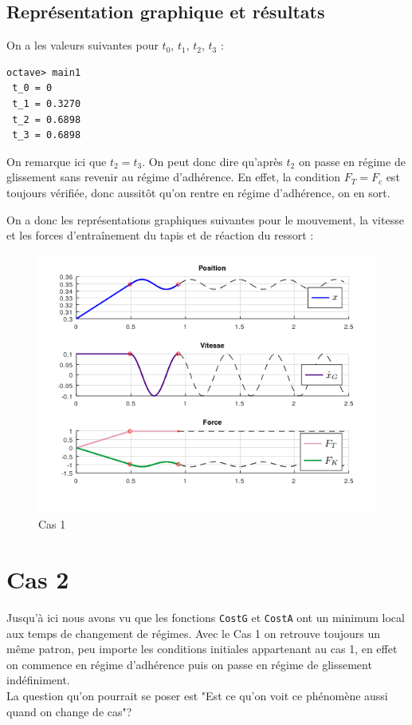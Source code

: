 \documentclass{article}
\newcommand{\ts}{\scriptscriptstyle}
\begin{document}
\subsection{Représentation graphique et résultats}
On a les valeurs suivantes pour $t_0$, $t_1$, $t_2$, $t_3$ :
\begin{lstlisting}
octave> main1
 t_0 = 0
 t_1 = 0.3270
 t_2 = 0.6898
 t_3 = 0.6898
\end{lstlisting}

On remarque ici que $t_2 = t_3$. On peut donc dire qu'après $t_2$ on passe en régime de glissement sans revenir au régime d'adhérence. En effet, la condition $F_{\ts{T}} = F_c$ est toujours vérifiée, donc aussitôt qu'on rentre en régime d'adhérence, on en sort.

On a donc les représentations graphiques suivantes pour le mouvement, la vitesse et les forces d'entraînement du tapis et de réaction du ressort : 
\begin{figure}[h!]
	\centering
	\includegraphics[scale=.5]{CAS1.png}
	\caption{Cas 1}
\end{figure}

\newpage
\section{Cas 2}
Jusqu'à ici nous avons vu que les fonctions \verb|CostG| et \verb|CostA| ont un minimum local aux temps de changement de régimes. Avec le Cas 1 on retrouve toujours un même patron, peu importe les conditions initiales appartenant au cas 1, en effet on commence en régime d'adhérence puis on passe en régime de glissement indéfiniment.\\
La question qu'on pourrait se poser est "Est ce qu'on voit ce phénomène aussi quand on change de cas"?  \\
\end{document}
